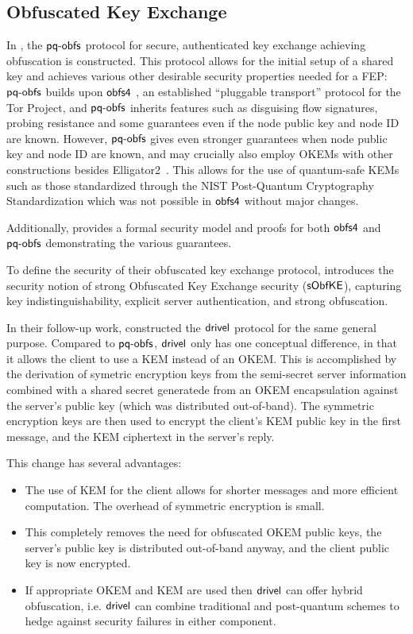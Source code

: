 \subsection{Obfuscated Key Exchange}

In \cite{CCS:GunSteVei24}, the $\textsf{pq-obfs}$ protocol for secure, authenticated key exchange achieving obfuscation is constructed. This protocol allows for the initial setup of a shared key and achieves various other desirable security properties needed for a FEP:
$\textsf{pq-obfs}$ builds upon $\textsf{obfs4}$ \cite{obfs4}, an established ``pluggable transport'' protocol for the Tor Project, and $\textsf{pq-obfs}$ inherits features such as disguising flow signatures, probing resistance and some guarantees even if the node public key and node ID are known.
However, $\textsf{pq-obfs}$ gives even stronger guarantees when node public key and node ID are known, and may crucially also employ OKEMs with other constructions besides \textsf{Elligator2}~\cite{CCS:BHKL13}. This allows for the use of quantum-safe KEMs such as those standardized through the NIST Post-Quantum Cryptography Standardization \cite{nist-standardization} which was not possible in $\textsf{obfs4}$ without major changes.

Additionally, \cite{CCS:GunSteVei24} provides a formal security model and proofs for both $\textsf{obfs4}$ and $\textsf{pq-obfs}$ demonstrating the various guarantees.

To define the security of their obfuscated key exchange protocol, \cite{CCS:GunSteVei24} introduces the security notion of strong Obfuscated Key Exchange security ($\mathsf{sObfKE}$), capturing key indistinguishability, explicit server authentication, and strong obfuscation.

In their follow-up work, \cite{EPRINT:GRSV25} constructed the $\textsf{drivel}$ protocol for the same general purpose. Compared to $\textsf{pq-obfs}$, $\textsf{drivel}$ only has one conceptual difference, in that it allows the client to use a KEM instead of an OKEM.
This is accomplished by the derivation of symetric encryption keys from the semi-secret server information combined with a shared secret generatede from an OKEM encapsulation against the server's public key (which was distributed out-of-band).
The symmetric encryption keys are then used to encrypt the client's KEM public key in the first message, and the KEM ciphertext in the server's reply.

This change has several advantages:
\begin{itemize}
    \item The use of KEM for the client allows for shorter messages and more efficient computation. The overhead of symmetric encryption is small.
    \item This completely removes the need for obfuscated OKEM public keys, the server's public key is distributed out-of-band anyway, and the client public key is now encrypted.
    \item If appropriate OKEM and KEM are used then $\textsf{drivel}$ can offer hybrid obfuscation, i.e. $\textsf{drivel}$ can combine traditional and post-quantum schemes to hedge against security failures in either component.
\end{itemize}


